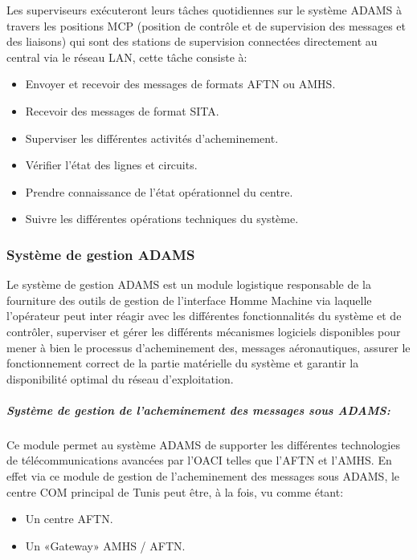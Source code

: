 Les superviseurs exécuteront leurs tâches quotidiennes sur le système ADAMS à travers les positions MCP (position de contrôle et de supervision des messages et des liaisons) qui sont des stations de supervision connectées directement au central via le réseau LAN, cette tâche consiste à: \\
\begin{itemize}
\item Envoyer et recevoir des messages de formats AFTN ou AMHS.\\
\item Recevoir des messages de format SITA.\\
\item Superviser les différentes activités d’acheminement.\\
\item Vérifier l’état des lignes et circuits.\\
\item Prendre connaissance de l’état opérationnel du centre.\\
\item Suivre les différentes opérations techniques du système.\\
\end{itemize}

\subsubsection{Système de gestion ADAMS}
Le système de gestion ADAMS est un module logistique responsable de la fourniture des outils de gestion de l’interface Homme Machine via laquelle l’opérateur peut inter réagir avec les différentes fonctionnalités du système et de contrôler, superviser et gérer les différents mécanismes logiciels disponibles pour  mener  à bien le processus d’acheminement des, messages aéronautiques, assurer le fonctionnement correct de la partie matérielle du système et garantir la disponibilité optimal du réseau d’exploitation.

\subparagraph{Système de gestion de l’acheminement des messages sous ADAMS:}

Ce module permet au système ADAMS de supporter les différentes technologies de télécommunications avancées par l’OACI telles que l’AFTN et l’AMHS. En effet via ce module de gestion de l’acheminement des messages sous ADAMS, le centre COM principal de Tunis peut être, à la fois, vu comme étant: \\
\begin{itemize}
\item Un centre AFTN. \\
\item Un «Gateway» AMHS / AFTN. \\
\end{itemize}

